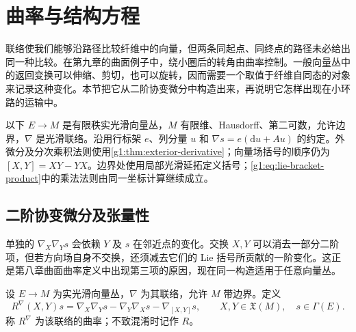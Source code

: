 
% 
% 

\section{曲率与结构方程}
\label{g1:sec:1503}

联络使我们能够沿路径比较纤维中的向量，但两条同起点、同终点的路径未必给出同一种比较。在第九章的曲面例子中，绕小圈后的转角由曲率控制。一般向量丛中的返回变换可以伸缩、剪切，也可以旋转，因而需要一个取值于纤维自同态的对象来记录这种变化。本节把它从二阶协变微分中构造出来，再说明它怎样出现在小环路的运输中。

\ProseParagraphBreak

以下 \(E\to M\) 是有限秩实光滑向量丛，\(M\) 有限维、Hausdorff、第二可数，允许边界，\(\nabla\) 是光滑联络。沿用行标架 \(e\)、列分量 \(u\) 和 \(\nabla s=e(\mathrm{d}u+Au)\) 的约定。外微分及分次乘积法则使用\cref{g1:thm:exterior-derivative}；向量场括号的顺序仍为 \([X,Y]=XY-YX\)。边界处使用局部光滑延拓定义括号；\eqref{g1:eq:lie-bracket-product}中的乘法法则由同一坐标计算继续成立。

\subsection{二阶协变微分及张量性}
\label{g1:subsec:1503:01}

单独的 \(\nabla_X\nabla_Ys\) 会依赖 \(Y\) 及 \(s\) 在邻近点的变化。交换 \(X,Y\) 可以消去一部分二阶项，但若方向场自身不交换，还须减去它们的 Lie 括号所贡献的一阶变化。这正是第八章曲面曲率定义中出现第三项的原因，现在同一构造适用于任意向量丛。

\begin{definition}[丛联络的曲率]\label{g1:def:bundle-curvature}
	设 \(E\to M\) 为实光滑向量丛，\(\nabla\) 为其联络，允许 \(M\) 带边界。定义
	\[
		R^\nabla(X,Y)s=\nabla_X\nabla_Ys-\nabla_Y\nabla_Xs-\nabla_{[X,Y]}s,
		\qquad X,Y\in\mathfrak X(M),\quad s\in\Gamma(E).
	\]
	称 \(R^\nabla\) 为该联络的曲率；不致混淆时记作 \(R\)。
\end{definition}

